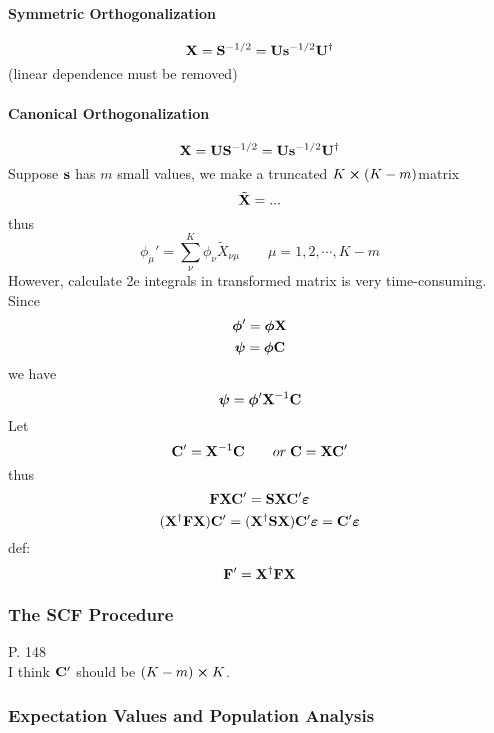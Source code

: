 \documentclass[a4paper]{article}
\numberwithin{equation}{section}
\begin{document}
\paragraph{Symmetric Orthogonalization}
\begin{equation}\label{key}
\vb{X} = \vb{S}^{-1/2} = \vb{U}\vb{s}^{-1/2}\vb{U}^\dagger
\end{equation}
(linear dependence must be removed)
\paragraph{Canonical Orthogonalization}
\begin{equation}\label{key}
\vb{X} = \vb{U}\vb{S}^{-1/2} = \vb{U}\vb{s}^{-1/2}\vb{U}^\dagger
\end{equation}
Suppose $ \vb{s} $ has $ m $ small values, we make a truncated $ K\cross (K-m) $matrix
\begin{equation}\label{key}
\tilde{\vb{X}} = ...
\end{equation}
thus
\begin{equation}\label{key}
\phi_\mu' = \sum_\nu^K \phi_\nu \tilde{X}_{\nu\mu} \qquad \mu = 1,2,\cdots,K-m
\end{equation}
However, calculate 2e integrals in transformed matrix is very time-consuming.\\
Since
\begin{equation}\label{key}
\bm\phi' = \bm\phi \vb{X}
\end{equation}
\begin{equation}\label{key}
\bm\psi = \bm\phi \vb{C}
\end{equation}
we have
\begin{equation}\label{key}
\bm\psi = \bm\phi' \vb{X}^{-1} \vb{C}
\end{equation}
Let
\begin{equation}\label{key}
\vb{C}' = \vb{X}^{-1} \vb{C} \qquad or \; \vb{C} = \vb{X}\vb{C}'
\end{equation}
thus
\begin{equation}\label{key}
\vb{F} \vb{X}\vb{C}' = \vb{S} \vb{X}\vb{C}' \bm\varepsilon
\end{equation}
\begin{equation}\label{key}
(\vb{X}^\dagger \vb{F}\vb{X}) \vb{C}' = (\vb{X}^\dagger \vb{S}\vb{X}) \vb{C}' \bm\varepsilon = \vb{C}'\bm\varepsilon 
\end{equation}
def:
\begin{equation}\label{key}
\vb{F}' = \vb{X}^\dagger \vb{F}\vb{X}
\end{equation}

\subsubsection{The SCF Procedure}
P. 148\\
I think $ \vb{C}' $ should be $ (K-m)\cross K $.

\subsubsection{Expectation Values and Population Analysis}
\end{document}
